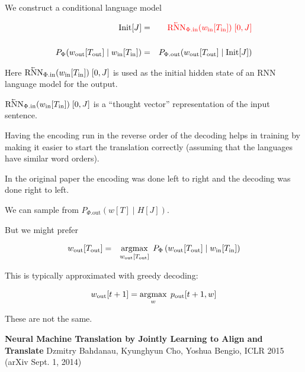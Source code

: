 {

\vfill
We construct a conditional language model

\begin{eqnarray*}
\mathrm{Init}[J] & = & {\color{red} \cev{\mathrm{RNN}}_{\Phi.\mathrm{in}}(w_{\mathrm{in}}[T_{\mathrm{in}}])\;[0,J]} \\
\\
P_\Phi(w_{\mathrm{out}}[T_{\mathrm{out}}]\; | \; w_{\mathrm{in}}[T_{\mathrm{in}}]) & = & P_{\Phi.\mathrm{out}}(w_{\mathrm{out}}[T_{\mathrm{out}}] \;|\;\mathrm{Init}[J])
\end{eqnarray*}

\vfill
Here {\color{red} $\cev{\mathrm{RNN}}_{\Phi.\mathrm{in}}(w_{\mathrm{in}}[T_{\mathrm{in}}])\;[0,J]$} is used as the initial hidden state of an RNN language model for the output.

\vfill
{\color{red} $\cev{\mathrm{RNN}}_{\Phi.\mathrm{in}}(w_{\mathrm{in}}[T_{\mathrm{in}}])\;[0,J]$} is a ``thought vector'' representation of the input sentence.


Having the encoding run in the reverse order of the decoding helps in training by making it easier to start the translation correctly
(assuming that the languages have similar word orders).

\vfill
In the original paper the encoding was done left to right and the decoding was done right to left.


We can sample from $P_{\Phi.\mathrm{out}}(w[T]\;|\;H[J])$.

\vfill
But we might prefer

\begin{eqnarray*}
w_{\mathrm{out}}[T_{\mathrm{out}}]
& = & \operatorname*{argmax}_{w_{\mathrm{out}}[T_{\mathrm{out}}]} \;P_\Phi\left(w_{\mathrm{out}}[T_{\mathrm{out}}] \;|\; w_{\mathrm{in}}[T_{\mathrm{in}}] \right)
\end{eqnarray*}

\vfill
This is typically approximated with greedy decoding:

\vfill
$$w_{\mathrm{out}}[t+1] = \operatorname*{argmax}_w\; p_{\mathrm{out}}[t+1,w]$$

\vfill
These are not the same.


{\bf Neural Machine Translation by Jointly Learning to Align and Translate}
Dzmitry Bahdanau, Kyunghyun Cho, Yoshua Bengio, ICLR 2015 (arXiv Sept. 1, 2014)

}
